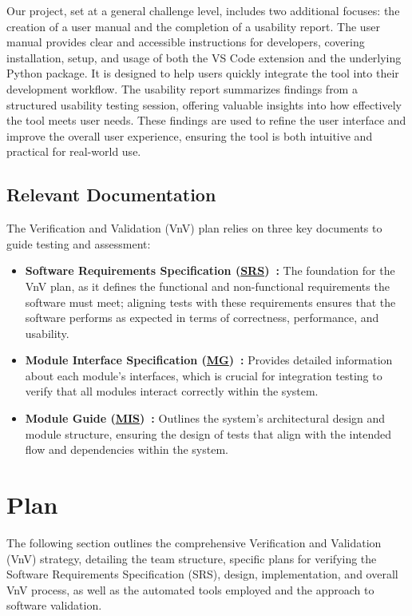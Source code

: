 \documentclass[12pt, titlepage]{article}
\newcommand{\SRS}{\href{https://github.com/ssm-lab/capstone--source-code-optimizer/blob/main/docs/SRS/SRS.pdf}{SRS}}
\newcommand{\MG}{\href{https://github.com/ssm-lab/capstone--source-code-optimizer/blob/main/docs/Design/SoftArchitecture/MG.pdf}{MG}}
\newcommand{\MIS}{\href{https://github.com/ssm-lab/capstone--source-code-optimizer/blob/main/docs/Design/SoftDetailedDes/MIS.pdf}{MIS}}
\begin{document}
Our project, set at a general challenge level, includes two additional focuses: the creation of a user manual and the completion of a usability report. The user manual provides clear and accessible instructions for developers, covering installation, setup, and usage of both the VS Code extension and the underlying Python package. It is designed to help users quickly integrate the tool into their development workflow. The usability report summarizes findings from a structured usability testing session, offering valuable insights into how effectively the tool meets user needs. These findings are used to refine the user interface and improve the overall user experience, ensuring the tool is both intuitive and practical for real-world use.

\subsection{Relevant Documentation}

The Verification and Validation (VnV) plan relies on three key documents to guide testing and assessment:
\begin{itemize}
  \item[] \textbf{Software Requirements Specification
    (\SRS)~\cite{SRS}:} The foundation for the VnV plan, as it
    defines the functional and non-functional requirements the
    software must meet; aligning tests with these requirements
    ensures that the software performs as expected in terms of
    correctness, performance, and usability.

  \item[] \textbf{Module Interface Specification (\MG)~\cite{MGDoc}:}
    Provides detailed information about each module's interfaces,
    which is crucial for integration testing to verify that all
    modules interact correctly within the system.

  \item[] \textbf{Module Guide (\MIS)~\cite{MISDoc}:} Outlines the
    system's architectural design and module structure, ensuring the
    design of tests that align with the intended flow and
    dependencies within the system.
\end{itemize}

\section{Plan}

The following section outlines the comprehensive Verification and
Validation (VnV) strategy, detailing the team structure, specific
plans for verifying the Software Requirements Specification (SRS),
design, implementation, and overall VnV process, as well as the
automated tools employed and the approach to software validation.
\end{document}
